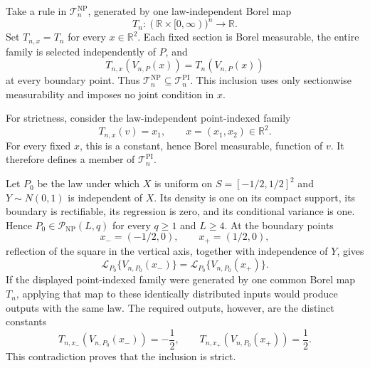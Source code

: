 Take a rule in \(\mathcal T_n^{\mathrm{NP}}\), generated by one law-independent Borel map
\[
 T_n:(\mathbb R\times[0,\infty))^n\longrightarrow\mathbb R.
\]
Set \(T_{n,x}=T_n\) for every \(x\in\mathbb R^2\).  Each fixed section is Borel measurable, the entire family is selected independently of \(P\), and
\[
 T_{n,x}(V_{n,P}(x))=T_n(V_{n,P}(x))
\]
at every boundary point.  Thus \(\mathcal T_n^{\mathrm{NP}}\subseteq\mathcal T_n^{\mathrm{PI}}\).  This inclusion uses only sectionwise measurability and imposes no joint condition in \(x\).

For strictness, consider the law-independent point-indexed family
\[
 T_{n,x}(v)=x_1,
 \qquad x=(x_1,x_2)\in\mathbb R^2.
\]
For every fixed \(x\), this is a constant, hence Borel measurable, function of \(v\).  It therefore defines a member of \(\mathcal T_n^{\mathrm{PI}}\).

Let \(P_0\) be the law under which \(X\) is uniform on \(S=[-1/2,1/2]^2\) and \(Y\sim N(0,1)\) is independent of \(X\).  Its density is one on its compact support, its boundary is rectifiable, its regression is zero, and its conditional variance is one.  Hence \(P_0\in\mathcal P_{\mathrm{NP}}(L,q)\) for every \(q\geq1\) and \(L\geq4\).  At the boundary points
\[
 x_-=(-1/2,0),
 \qquad
 x_+=(1/2,0),
\]
reflection of the square in the vertical axis, together with independence of \(Y\), gives
\[
 \mathcal L_{P_0}\{V_{n,P_0}(x_-)\}
 =\mathcal L_{P_0}\{V_{n,P_0}(x_+)\}.
\]
If the displayed point-indexed family were generated by one common Borel map \(T_n\), applying that map to these identically distributed inputs would produce outputs with the same law.  The required outputs, however, are the distinct constants
\[
 T_{n,x_-}(V_{n,P_0}(x_-))=-\frac12,
 \qquad
 T_{n,x_+}(V_{n,P_0}(x_+))=\frac12.
\]
This contradiction proves that the inclusion is strict.